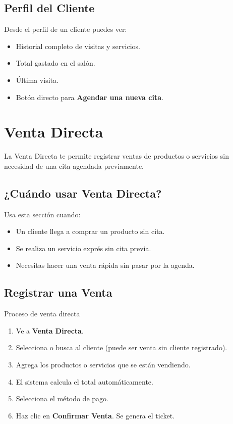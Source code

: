 \documentclass[12pt,a4paper]{article}
\begin{document}
\subsection{Perfil del Cliente}

Desde el perfil de un cliente puedes ver:
\begin{itemize}[leftmargin=*]
  \item Historial completo de visitas y servicios.
  \item Total gastado en el salón.
  \item Última visita.
  \item Botón directo para \textbf{Agendar una nueva cita}.
\end{itemize}

\newpage
\section{Venta Directa}

La Venta Directa te permite registrar ventas de productos o servicios sin necesidad de una cita agendada previamente.

\subsection{¿Cuándo usar Venta Directa?}

Usa esta sección cuando:
\begin{itemize}[leftmargin=*]
  \item Un cliente llega a comprar un producto sin cita.
  \item Se realiza un servicio exprés sin cita previa.
  \item Necesitas hacer una venta rápida sin pasar por la agenda.
\end{itemize}

\subsection{Registrar una Venta}

\begin{pasobox}{Proceso de venta directa}
\begin{enumerate}[leftmargin=*]
  \item Ve a \textbf{Venta Directa}.
  \item Selecciona o busca al cliente (puede ser venta sin cliente registrado).
  \item Agrega los productos o servicios que se están vendiendo.
  \item El sistema calcula el total automáticamente.
  \item Selecciona el método de pago.
  \item Haz clic en \textbf{Confirmar Venta}. Se genera el ticket.
\end{enumerate}
\end{pasobox}
\end{document}
